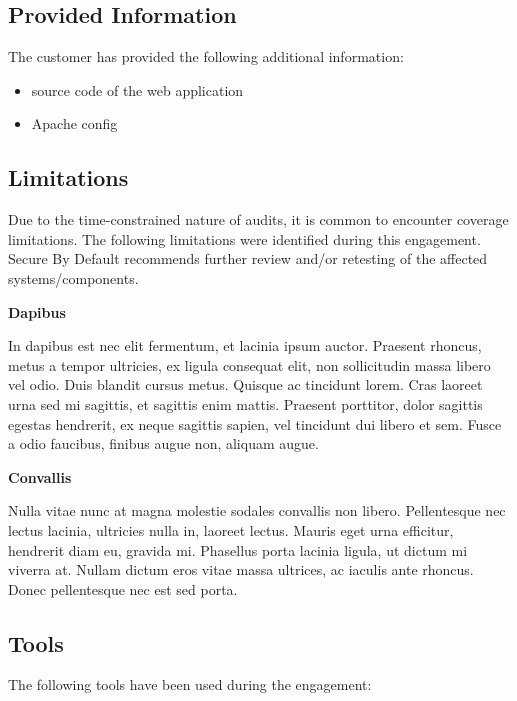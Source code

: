 \documentclass[a4paper]{article}
\begin{document}
  \subsection{Provided Information}

  The customer has provided the following additional information:

  \begin{itemize}
          \item source code of the web application

          \item Apache config

      \end{itemize}

  \subsection{Limitations}

  Due to the time-constrained nature of audits, it is common to encounter coverage limitations.
  The following limitations were identified during this engagement.
  Secure By Default recommends further review and/or retesting of the affected systems/components.

  \textbf{Dapibus}

In dapibus est nec elit fermentum, et lacinia ipsum auctor.
Praesent rhoncus, metus a tempor ultricies, ex ligula consequat elit, non sollicitudin massa libero vel odio.
Duis blandit cursus metus.
Quisque ac tincidunt lorem.
Cras laoreet urna sed mi sagittis, et sagittis enim mattis.
Praesent porttitor, dolor sagittis egestas hendrerit, ex neque sagittis sapien, vel tincidunt dui libero et sem.
Fusce a odio faucibus, finibus augue non, aliquam augue.

\textbf{Convallis}

Nulla vitae nunc at magna molestie sodales convallis non libero.
Pellentesque nec lectus lacinia, ultricies nulla in, laoreet lectus.
Mauris eget urna efficitur, hendrerit diam eu, gravida mi.
Phasellus porta lacinia ligula, ut dictum mi viverra at.
Nullam dictum eros vitae massa ultrices, ac iaculis ante rhoncus.
Donec pellentesque nec est sed porta.


\subsection{Tools}

The following tools have been used during the engagement:
\end{document}
